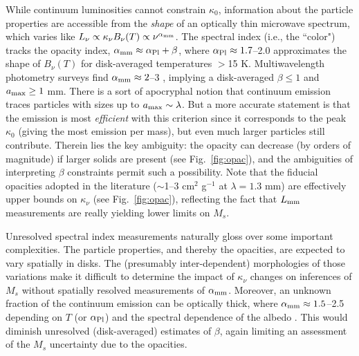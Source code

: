\documentclass[a4paper]{ar-1col}
\begin{document}
While continuum luminosities cannot constrain $\kappa_0$, information about the particle properties are accessible from the {\it shape} of an optically thin microwave spectrum, which varies like $L_\nu \propto \kappa_\nu B_\nu(T) \propto \nu^{\alpha_{\rm mm}}$.  The spectral index (i.e., the ``color") tracks the opacity index, $\alpha_{\rm mm} \approx \alpha_{\rm Pl} + \beta$, where $\alpha_{\rm Pl} \approx 1.7$--2.0 approximates the shape of $B_\nu(T)$ for disk-averaged temperatures $>$15 K.  Multiwavelength photometry surveys find $\alpha_{\rm mm} \approx 2$--3 \citep{beckwith91,mannings94,ricci10a,ricci10b,ricci12}, implying a disk-averaged $\beta \le 1$ and $a_{\rm max} \ge 1$ mm.  There is a sort of apocryphal notion that continuum emission traces particles with sizes up to $a_{\rm max} \sim \lambda$.  But a more accurate statement is that the emission is most {\it efficient} with this criterion since it corresponds to the peak $\kappa_0$ (giving the most emission per mass), but even much larger particles still contribute.  Therein lies the key ambiguity: the opacity can decrease (by orders of magnitude) if larger solids are present (see Fig.~\ref{fig:opac}), and the ambiguities of interpreting $\beta$ constraints permit such a possibility.  Note that the fiducial opacities adopted in the literature ($\sim$1--3 cm$^2$ g$^{-1}$ at $\lambda = 1.3$ mm) are effectively upper bounds on $\kappa_\nu$ (see Fig.~\ref{fig:opac}), reflecting the fact that $L_{\rm mm}$ measurements are really yielding lower limits on $M_s$. 

Unresolved spectral index measurements naturally gloss over some important complexities.  The particle properties, and thereby the opacities, are expected to vary spatially in disks.  The (presumably inter-dependent) morphologies of those variations make it difficult to determine the impact of $\kappa_\nu$ changes on inferences of $M_s$ without spatially resolved measurements of $\alpha_{\rm mm}$.  Moreover, an unknown fraction of the continuum emission can be optically thick, where $\alpha_{\rm mm} \approx 1.5$--2.5 depending on $T$ (or $\alpha_{\rm Pl}$) and the spectral dependence of the albedo \citep{zhu19,liu19}.  This would diminish unresolved (disk-averaged) estimates of $\beta$, again limiting an assessment of the $M_s$ uncertainty due to the opacities.
\end{document}
